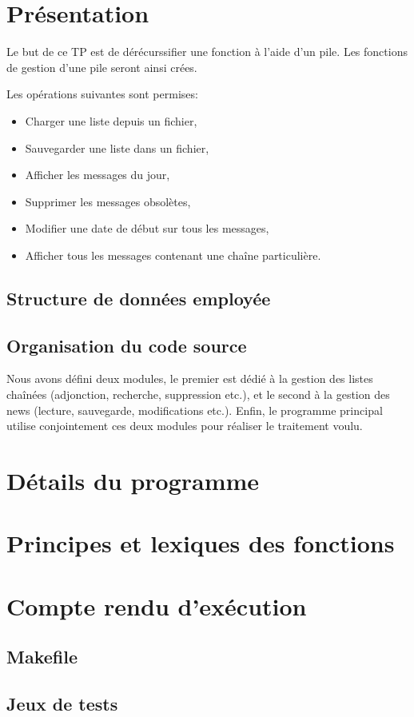 \documentclass{report}
\begin{document}
  
  \setlength{\parskip}{10pt}
  \setlength{\parindent}{0pt}
  \chapter{Présentation}
    Le but de ce TP est de dérécurssifier une fonction à l'aide d'un pile. Les fonctions de gestion d'une pile seront ainsi crées.

    

    Les opérations suivantes sont permises:
    \begin{itemize}
      \item Charger une liste depuis un fichier,
      \item Sauvegarder une liste dans un fichier,
      \item Afficher les messages du jour,
      \item Supprimer les messages obsolètes,
      \item Modifier une date de début sur tous les messages,
      \item Afficher tous les messages contenant une chaîne particulière.
    \end{itemize}

    \section{Structure de données employée}
      
    \section{Organisation du code source}
      Nous avons défini deux modules, le premier est dédié à la gestion des listes chaînées (adjonction, recherche, suppression etc.), et le second à la gestion des news (lecture, sauvegarde, modifications etc.). Enfin, le programme principal utilise conjointement ces deux modules pour réaliser le traitement voulu.
      
  \chapter{Détails du programme}
    

 \chapter{Principes et lexiques des fonctions}
    

  \chapter{Compte rendu d'exécution}
    \section{Makefile}

    \section{Jeux de tests}
      
\end{document}

